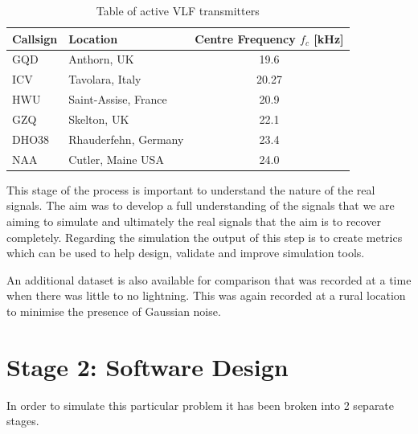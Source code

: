 \begin{table}[h!]
\centering
\begin{tabular}{l|l|c}
\textbf{Callsign} & \textbf{Location}    & \textbf{Centre Frequency $f_c$ [kHz]} \\
\hline 
GQD               & Anthorn, UK          & 19.6                            \\
ICV             & Tavolara, Italy & 20.27 \\
HWU               & Saint-Assise, France & 20.9                            \\
GZQ               & Skelton, UK          & 22.1                            \\
DHO38             & Rhauderfehn, Germany & 23.4                            \\
NAA               & Cutler, Maine USA    & 24.0                             
\end{tabular}
\caption{Table of active VLF transmitters}
\label{tab:vlftransmitters}
\end{table}

This stage of the process is important to understand the nature of the real signals. The aim was to develop a full understanding of the signals that we are aiming to simulate and ultimately the real signals that the aim is to recover completely. Regarding the simulation the output of this step is to create metrics which can be used to help design, validate and improve simulation tools.

An additional dataset is also available for comparison that was recorded at a time when there was little to no lightning. This was again recorded at a rural location to minimise the presence of Gaussian noise.

\section{Stage 2: Software Design}
In order to simulate this particular problem it has been broken into 2 separate stages.
